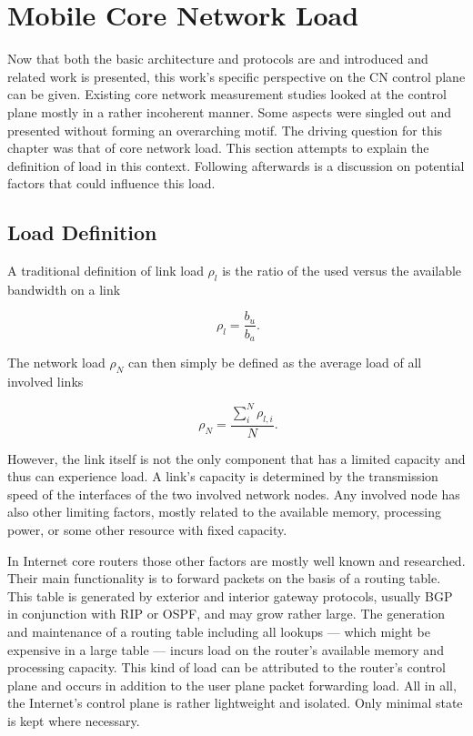 \section{Mobile Core Network Load}
\label{c4:sec:loaddefinition}

Now that both the basic architecture and protocols are and introduced and related work is presented, this work's specific perspective on the \gls{CN} control plane can be given. Existing core network measurement studies looked at the control plane mostly in a rather incoherent manner. Some aspects were singled out and presented without forming an overarching motif. The driving question for this chapter was that of core network load. This section attempts to explain the definition of load in this context. Following afterwards is a discussion on potential factors that could influence this load.


\subsection{Load Definition}

A traditional definition of link load $\rho_{l}$ is the ratio of the used versus the available bandwidth on a link

\begin{equation}
	\phantom{.}\rho_{l} = \frac{b_{u}}{b_{a}}\text{.}
\end{equation}

The network load $\rho_{N}$ can then simply be defined as the average load of all involved links

\begin{equation}
	\phantom{.}\rho_{N} = \frac{\sum_{i}^{N} \rho_{l,i}}{N}\text{.}
\end{equation}

However, the link itself is not the only component that has a limited capacity and thus can experience load. A link's capacity is determined by the transmission speed of the interfaces of the two involved network nodes. Any involved node has also other limiting factors, mostly related to the available memory, processing power, or some other resource with fixed capacity.

In Internet core routers those other factors are mostly well known and researched. Their main functionality is to forward packets on the basis of a routing table. This table is generated by exterior and interior gateway protocols, usually \gls{BGP} in conjunction with \gls{RIP} or \gls{OSPF}, and may grow rather large. The generation and maintenance of a routing table including all lookups --- which might be expensive in a large table --- incurs load on the router's available memory and processing capacity. This kind of load can be attributed to the router's control plane and occurs in addition to the user plane packet forwarding load. All in all, the Internet's control plane is rather lightweight and isolated. Only minimal state is kept where necessary.

